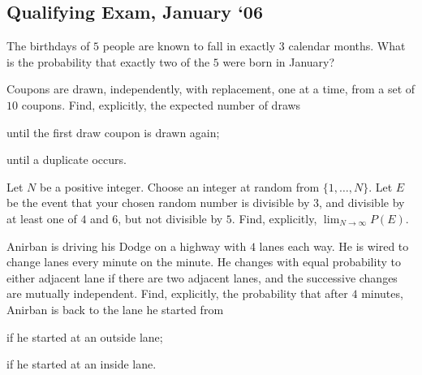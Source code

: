 \subsection{Qualifying Exam, January `06}
\begin{problem}
  The birthdays of \(5\) people are known to fall in exactly \(3\) calendar
  months. What is the probability that exactly two of the \(5\) were born
  in January?
\end{problem}
\begin{solution*}
\end{solution*}

\begin{problem}
  Coupons are drawn, independently, with replacement, one at a time, from a
  set of \(10\) coupons. Find, explicitly, the expected number of draws
  \begin{alphlist}
  \item until the first draw coupon is drawn again;
  \item until a duplicate occurs.
  \end{alphlist}
\end{problem}
\begin{solution*}
\end{solution*}

\begin{problem}
  Let \(N\) be a positive integer. Choose an integer at random from
  \(\{1,\dotsc,N\}\). Let \(E\) be the event that your chosen random number
  is divisible by \(3\), and divisible by at least one of \(4\) and \(6\),
  but not divisible by \(5\). Find, explicitly, \(\lim_{N\to\infty}P(E)\).
\end{problem}
\begin{solution*}
\end{solution*}

\begin{problem}
  Anirban is driving his Dodge on a highway with \(4\) lanes each way. He
  is wired to change lanes every minute on the minute. He changes with
  equal probability to either adjacent lane if there are two adjacent
  lanes, and the successive changes are mutually independent. Find,
  explicitly, the probability that after \(4\) minutes, Anirban is back to
  the lane he started from
  \begin{alphlist}
  \item if he started at an outside lane;
  \item if he started at an inside lane.
  \end{alphlist}
\end{problem}
\begin{solution*}
\end{solution*}

